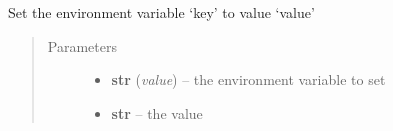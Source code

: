 \documentclass[a4paper,10pt,english]{sphinxmanual}
\begin{document}
\begin{fulllineitems}
\begin{fulllineitems}
\end{fulllineitems}


\begin{fulllineitems}
\label{commands/apidoc/src:src.fileEnviron.FileEnviron.set}
Set the environment variable `key' to value `value'
\begin{quote}\begin{description}
\item[{Parameters}] \leavevmode\begin{itemize}
\item {} 
\textbf{str} (\emph{value}) -- the environment variable to set

\item {} 
\textbf{str} -- the value

\end{itemize}

\end{description}\end{quote}

\end{fulllineitems}


\end{fulllineitems}

\end{document}
